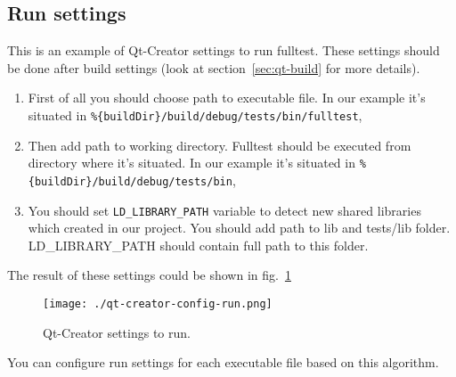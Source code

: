 \subsection{Run settings}

This is an example of Qt-Creator settings to run fulltest. These settings should be done after build settings (look at section~\ref{sec:qt-build} for more details).

\begin{enumerate}
  \item First of all you should choose path to executable file. In our example it's situated in \texttt{\%\{buildDir\}/build/debug/tests/bin/fulltest},
  \item Then add path to working directory. Fulltest should be executed from directory where it's situated. In our example it's situated in \texttt{\%\{buildDir\}/build/debug/tests/bin},
  \item You should set \texttt{LD\_LIBRARY\_PATH} variable to detect new shared libraries which created in our project. You should add path to lib and tests/lib folder. LD\_LIBRARY\_PATH should contain full path to this folder.
\end{enumerate}

The result of these settings could be shown in fig.~\ref{fig:qt-creator-config-run}

\begin{figure}[htb]
  \centering
  \texttt{[image: ./qt-creator-config-run.png]}
  \caption{Qt-Creator settings to run.}
  \label{fig:qt-creator-config-run}
\end{figure}

You can configure run settings for each executable file based on this algorithm.


